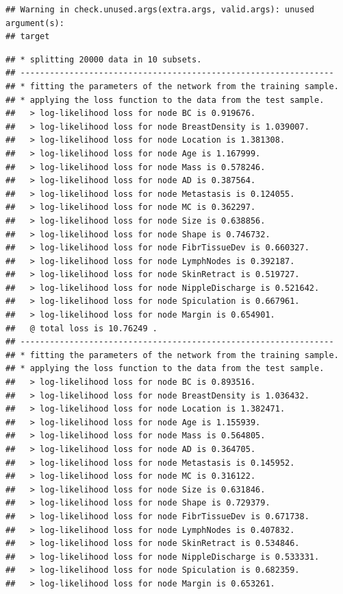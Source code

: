\documentclass[]{article}
\begin{document}
\begin{verbatim}
## Warning in check.unused.args(extra.args, valid.args): unused argument(s):
## target
\end{verbatim}

\begin{verbatim}
## * splitting 20000 data in 10 subsets.
## ----------------------------------------------------------------
## * fitting the parameters of the network from the training sample.
## * applying the loss function to the data from the test sample.
##   > log-likelihood loss for node BC is 0.919676.
##   > log-likelihood loss for node BreastDensity is 1.039007.
##   > log-likelihood loss for node Location is 1.381308.
##   > log-likelihood loss for node Age is 1.167999.
##   > log-likelihood loss for node Mass is 0.578246.
##   > log-likelihood loss for node AD is 0.387564.
##   > log-likelihood loss for node Metastasis is 0.124055.
##   > log-likelihood loss for node MC is 0.362297.
##   > log-likelihood loss for node Size is 0.638856.
##   > log-likelihood loss for node Shape is 0.746732.
##   > log-likelihood loss for node FibrTissueDev is 0.660327.
##   > log-likelihood loss for node LymphNodes is 0.392187.
##   > log-likelihood loss for node SkinRetract is 0.519727.
##   > log-likelihood loss for node NippleDischarge is 0.521642.
##   > log-likelihood loss for node Spiculation is 0.667961.
##   > log-likelihood loss for node Margin is 0.654901.
##   @ total loss is 10.76249 .
## ----------------------------------------------------------------
## * fitting the parameters of the network from the training sample.
## * applying the loss function to the data from the test sample.
##   > log-likelihood loss for node BC is 0.893516.
##   > log-likelihood loss for node BreastDensity is 1.036432.
##   > log-likelihood loss for node Location is 1.382471.
##   > log-likelihood loss for node Age is 1.155939.
##   > log-likelihood loss for node Mass is 0.564805.
##   > log-likelihood loss for node AD is 0.364705.
##   > log-likelihood loss for node Metastasis is 0.145952.
##   > log-likelihood loss for node MC is 0.316122.
##   > log-likelihood loss for node Size is 0.631846.
##   > log-likelihood loss for node Shape is 0.729379.
##   > log-likelihood loss for node FibrTissueDev is 0.671738.
##   > log-likelihood loss for node LymphNodes is 0.407832.
##   > log-likelihood loss for node SkinRetract is 0.534846.
##   > log-likelihood loss for node NippleDischarge is 0.533331.
##   > log-likelihood loss for node Spiculation is 0.682359.
##   > log-likelihood loss for node Margin is 0.653261.

\end{verbatim}
\end{document}
